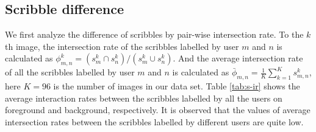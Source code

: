 \documentclass[runningheads,a4paper]{llncs}
\begin{document}
\subsection{Scribble difference}

We first analyze the difference of scribbles by pair-wise intersection rate. To the $k$th image, the intersection rate of the scribbles labelled by user $m$ and $n$ is calculated as $\phi^{k}_{m,n}=(s^{k}_{m}\cap s^{k}_{n})/(s^{k}_{m}\cup s^{k}_{n})$. And the average intersection rate of all the scribbles labelled by user $m$ and $n$ is calculated as $\bar{\phi}_{m,n}=\frac{1}{K}\sum^{K}_{k=1}{s^{k}_{m,n}}$, here $K=96$ is the number of images in our data set. Table \ref{tab:s-ir} shows the average interaction rates between the scribbles labelled by all the users on foreground and background, respectively. It is observed that the values of average intersection rates between the scribbles labelled by different users are quite low.


\end{document}
